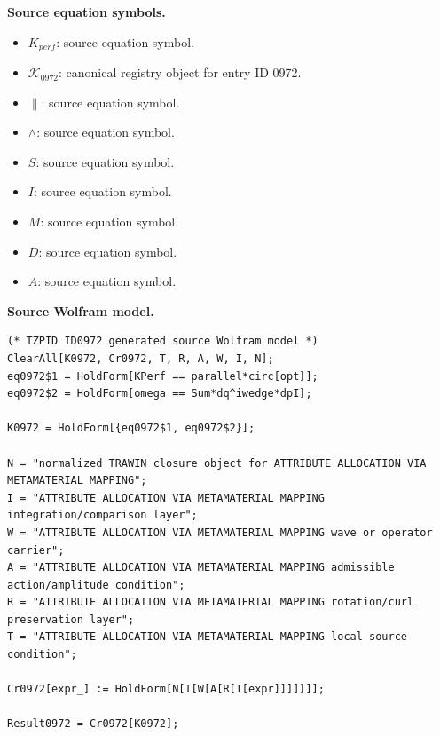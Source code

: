 \begin{minipage}[t]{0.49\linewidth}
\begingroup
\small
\raggedright
\textbf{Source equation symbols.}\par
\begin{itemize}[leftmargin=1.35em,itemsep=1pt,topsep=1pt,parsep=0pt]
    \item $K_{perf}$: source equation symbol.
    \item $\mathcal{K}_{0972}$: canonical registry object for entry ID 0972.
    \item $\parallel$: source equation symbol.
    \item $\wedge$: source equation symbol.
    \item $S$: source equation symbol.
    \item $I$: source equation symbol.
    \item $M$: source equation symbol.
    \item $D$: source equation symbol.
    \item $A$: source equation symbol.
\end{itemize}
\endgroup
\end{minipage}\hfill
\begin{minipage}[t]{0.47\linewidth}
\begingroup
\scriptsize
\raggedright
\textbf{Source Wolfram model.}\par
\begin{Verbatim}[fontsize=\tiny,breaklines=true,breakanywhere=true]
(* TZPID ID0972 generated source Wolfram model *)
ClearAll[K0972, Cr0972, T, R, A, W, I, N];
eq0972$1 = HoldForm[KPerf == parallel*circ[opt]];
eq0972$2 = HoldForm[omega == Sum*dq^iwedge*dpI];

K0972 = HoldForm[{eq0972$1, eq0972$2}];

N = "normalized TRAWIN closure object for ATTRIBUTE ALLOCATION VIA METAMATERIAL MAPPING";
I = "ATTRIBUTE ALLOCATION VIA METAMATERIAL MAPPING integration/comparison layer";
W = "ATTRIBUTE ALLOCATION VIA METAMATERIAL MAPPING wave or operator carrier";
A = "ATTRIBUTE ALLOCATION VIA METAMATERIAL MAPPING admissible action/amplitude condition";
R = "ATTRIBUTE ALLOCATION VIA METAMATERIAL MAPPING rotation/curl preservation layer";
T = "ATTRIBUTE ALLOCATION VIA METAMATERIAL MAPPING local source condition";

Cr0972[expr_] := HoldForm[N[I[W[A[R[T[expr]]]]]]];

Result0972 = Cr0972[K0972];
\end{Verbatim}
\endgroup
\end{minipage}

